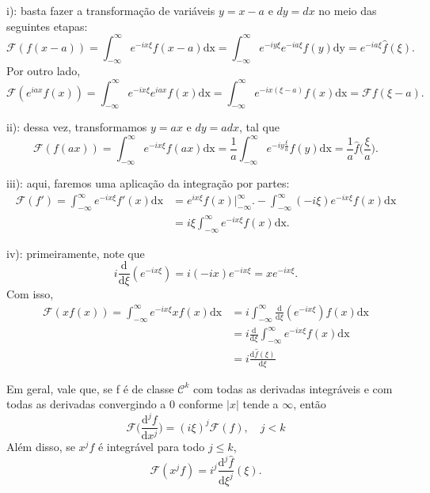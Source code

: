 \documentclass[../pde_notes.tex]{subfiles}
\begin{document}
\begin{proof*}
	i): basta fazer a transformação de variáveis \(y = x-a\) e \(dy = dx\) no meio das seguintes etapas:
	\[
		\mathcal{F}(f(x-a)) = \int_{-\infty}^{\infty}e^{-ix\xi }f(x-a) \mathrm{dx} = \int_{-\infty}^{\infty}e^{-iy\xi }e^{-ia\xi }f(y) \mathrm{dy} = e^{-ia\xi }\hat{f}(\xi ).
	\]
	Por outro lado,
	\[
		\mathcal{F}(e^{iax}f(x)) = \int_{-\infty}^{\infty}e^{-ix\xi }e^{iax}f(x) \mathrm{dx} = \int_{-\infty}^{\infty}e^{-ix(\xi -a)}f(x) \mathrm{dx} = \mathcal{F}f(\xi -a).
	\]

	ii): dessa vez, transformamos \(y = ax\) e \(dy = adx\), tal que
	\[
		\mathcal{F}(f(ax)) = \int_{-\infty}^{\infty}e^{-ix\xi }f(ax) \mathrm{dx} = \frac{1}{a}\int_{-\infty}^{\infty}e^{-iy \frac{\xi }{a}}f(y) \mathrm{dx} = \frac{1}{a}\hat{f}\biggl(\frac{\xi }{a}\biggr).
	\]

	iii): aqui, faremos uma aplicação da integração por partes:
	\begin{align*}
		\mathcal{F}(f') = \int_{-\infty}^{\infty}e^{-ix\xi }f'(x) \mathrm{dx} & = e^{ix\xi }f(x)\biggl|_{-\infty}^{\infty}\biggr. - \int_{-\infty}^{\infty}(-i\xi )e^{-ix\xi }f(x) \mathrm{dx} \\
		                                                                      & = i\xi \int_{-\infty}^{\infty}e^{-ix\xi }f(x) \mathrm{dx}.
	\end{align*}

	iv): primeiramente, note que
	\[
		i \frac{\mathrm{d}}{\mathrm{d}\xi }(e^{-ix\xi }) = i(-ix)e^{-ix\xi }=xe^{-ix\xi }.
	\]
	Com isso,
	\begin{align*}
		\mathcal{F}(xf(x)) = \int_{-\infty}^{\infty}e^{-ix\xi }xf(x) \mathrm{dx} & = i \int_{-\infty}^{\infty}\frac{\mathrm{d}}{\mathrm{d}\xi }(e^{-ix\xi })f(x) \mathrm{dx} \\
		                                                                         & = i \frac{\mathrm{d}}{\mathrm{d}\xi }\int_{-\infty}^{\infty}e^{-ix\xi }f(x) \mathrm{dx}   \\
		                                                                         & = i \frac{\mathrm{d}\hat{f}(\xi )}{\mathrm{d}\xi }
	\end{align*}
\end{proof*}
Em geral, vale que, se f é de classe \(\mathcal{C}^{k}\) com todas as derivadas integráveis e com todas as derivadas convergindo a 0 conforme \(|x|\) tende a \(\infty\), então
\[
	\mathcal{F}\biggl(\frac{\mathrm{d}^{j}f}{\mathrm{d}x^{j}}\biggr)= (i\xi )^{j}\mathcal{F}(f),\quad j< k
\]
Além disso, se \(x^{j}f\) é integrável para todo \(j\leq k\),
\[
	\mathcal{F}(x^{j}f) = i^{j}\frac{\mathrm{d}^{j}\hat{f}}{\mathrm{d}\xi^{j}}(\xi ).
\]
\end{document}
